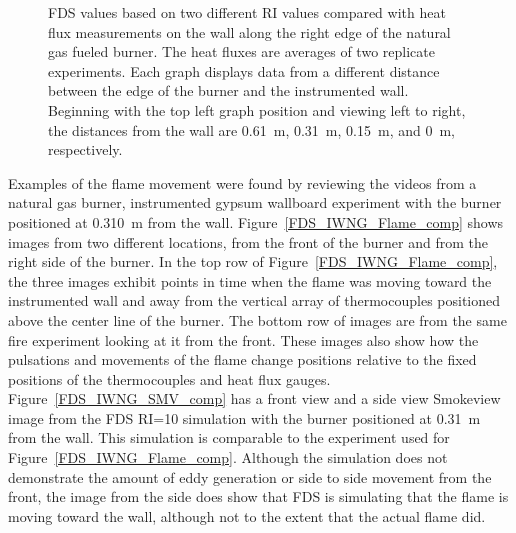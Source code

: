 \documentclass[twoside]{uocthesis}
\begin{document}
{\begin{figure}[ht!]
  \caption[FDS values based on two different RI values compared with heat flux measurements on the wall along the right edge of the natural gas fueled burner]{FDS values based on two different RI values compared with heat flux measurements on the wall along the right edge of the natural gas fueled burner. The heat fluxes are averages of two replicate experiments. Each graph displays data from a different distance between the edge of the burner and the instrumented wall.  Beginning with the top left graph position and viewing left to right, the distances from the wall are 0.61~m, 0.31~m, 0.15~m, and 0~m, respectively.}
  \label{FDS_HFEdge_IWNG_comp}
\end{figure}

Examples of the flame movement were found by reviewing the videos from a natural gas burner, instrumented gypsum wallboard experiment with the burner positioned at 0.310~m from the wall.  Figure~\ref{FDS_IWNG_Flame_comp} shows images from two different locations, from the front of the burner and from the right side of the burner.  In the top row of Figure~\ref{FDS_IWNG_Flame_comp}, the three images exhibit points in time when the flame was moving toward the instrumented wall and away from the vertical array of thermocouples positioned above the center line of the burner.  The bottom row of images are from the same fire experiment looking at it from the front.  These images also show how the pulsations and movements of the flame change positions relative to the fixed positions of the thermocouples and heat flux gauges. 
Figure~\ref{FDS_IWNG_SMV_comp} has a front view and a side view Smokeview image from the FDS RI=10 simulation with the burner positioned at 0.31~m from the wall.  This simulation is comparable to the experiment used for Figure~\ref{FDS_IWNG_Flame_comp}.  Although the simulation does not demonstrate the amount of eddy generation or side to side movement from the front, the image from the side does show that FDS is simulating that the flame is moving toward the wall, although not to the extent that the actual flame did. 

}
\end{document}

